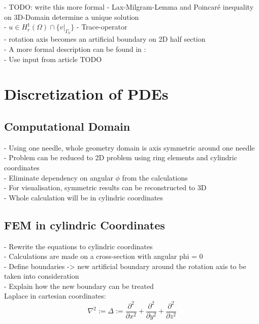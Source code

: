\documentclass[parskip=half, titlepage=yes, 12pt, BCOR=12mm, DIV=calc]{scrartcl}
\begin{document}
- TODO: write this more formal
- Lax-Milgram-Lemma and Poincaré inequality on 3D-Domain determine a unique solution \\
- $u \in H^{1}_{r}(\Omega) \cap \{ v|_{\Gamma_{0}} \}  $
- Trace-operator \\
- rotation axis becomes an artificial boundary on 2D half section \\

- A more formal description can be found in : \\
- Use input from article TODO \\


\section{Discretization of PDEs}

\subsection{Computational Domain}
- Using one needle, whole geometry domain is axis symmetric around one needle \\
- Problem can be reduced to 2D problem using ring elements and cylindric coordinates \\
- Eliminate dependency on angular $\phi$ from the calculations \\
- For visualisation, symmetric results can be reconstructed to 3D \\
- Whole calculation will be in cylindric coordinates \\

\subsection{FEM in cylindric Coordinates}
- Rewrite the equations to cylindric coordinates \\
- Calculations are made on a cross-section with angular phi = 0 \\
- Define boundaries -> new artificial boundary around the rotation axis to be taken into consideration \\
- Explain how the new boundary can be treated \\
 
Laplace in cartesian coordinates:
\begin{equation}
    \nabla^2 := \Delta := \frac{\partial^2}{\partial x^2} + \frac{\partial^2}{\partial y^2} + \frac{\partial^2}{\partial z^2}
\end{equation}
\end{document}

